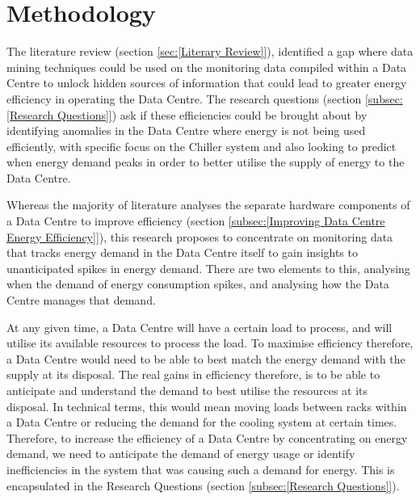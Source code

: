 \documentclass[12pt]{scrartcl}
\begin{document}
\section{Methodology}

\label{sec:[Methodology]}

The literature review (section \ref{sec:[Literary Review]}), identified a gap where data mining techniques could be used on the monitoring data compiled within a Data Centre to unlock hidden sources of information that could lead to greater energy efficiency in operating the Data Centre. The research questions (section \ref{subsec:[Research Questions]}) ask if these efficiencies could be brought about by identifying anomalies in the Data Centre where energy is not being used efficiently, with specific focus on the Chiller system and also looking to predict when energy demand peaks in order to better utilise the supply of energy to the Data Centre.

 

Whereas the majority of literature analyses the separate hardware components of a Data Centre to improve efficiency (section \ref{subsec:[Improving Data Centre Energy Efficiency]}), this research proposes to concentrate on monitoring data that tracks energy demand in the Data Centre itself to gain insights to unanticipated spikes in energy demand. There are two elements to this, analysing when the demand of energy consumption spikes, and analysing how the Data Centre manages that demand. 

 

At any given time, a Data Centre will have a certain load to process, and will utilise its available resources to process the load. To maximise efficiency therefore, a Data Centre would need to be able to best match the energy demand with the supply at its disposal. The real gains in efficiency therefore, is to be able to anticipate and understand the demand to best utilise the resources at its disposal. In technical terms, this would mean moving loads between racks within a Data Centre or reducing the demand for the cooling system at certain times. Therefore, to increase the efficiency of a Data Centre by concentrating on energy demand, we need to anticipate the demand of energy usage or identify inefficiencies in the system that was causing such a demand for energy. This is encapsulated in the Research Questions (section \ref{subsec:[Research Questions]}).
\end{document}

